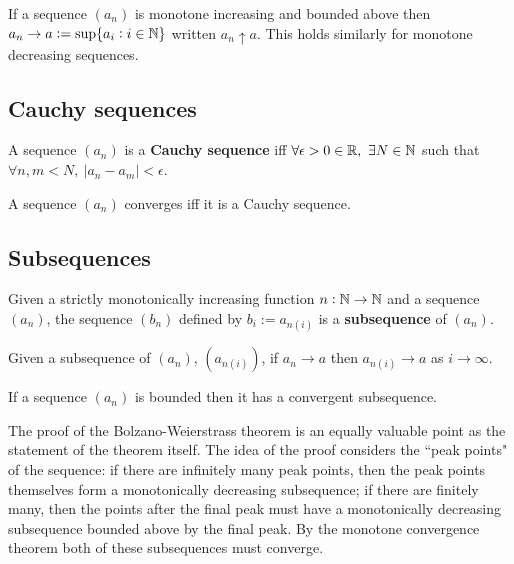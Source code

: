 \documentclass{article}
\begin{document}
\begin{theorem}
    If a sequence $(a_n)$ is monotone increasing and bounded above then $a_n\rightarrow a := \sup\{a_i:i\in\mathbb{N}\}$ written $a_n\uparrow a$. This holds similarly for monotone decreasing sequences.
\end{theorem}

\subsection{Cauchy sequences}

\begin{definition}
   A sequence $(a_n)$ is a \textbf{Cauchy sequence} iff $\forall \epsilon>0\in\mathbb{R}, \ \exists N\in\mathbb{N}$ such that $\forall n,m<N, \ |a_n-a_m|<\epsilon$.
\end{definition}

\begin{theorem}
    A sequence $(a_n)$ converges iff it is a Cauchy sequence.
\end{theorem}

\subsection{Subsequences}

\begin{definition}[Subsequence]
    Given a strictly monotonically increasing function $n:\mathbb{N}\rightarrow\mathbb{N}$ and a sequence $(a_n)$, the  sequence $(b_n)$ defined by $b_i:=a_{n(i)}$ is a \textbf{subsequence} of $(a_n)$.
\end{definition}

\begin{theorem}
    Given a subsequence of $(a_n)$, $(a_{n(i)})$, if $a_n\rightarrow a$ then $a_{n(i)}\rightarrow a$ as $i\rightarrow\infty$.
\end{theorem}

\begin{theorem}
    If a sequence $(a_n)$ is bounded then it has a convergent subsequence.
\end{theorem}

\begin{note}
    The proof of the Bolzano-Weierstrass theorem is an equally valuable point as the statement of the theorem itself. The idea of the proof considers the ``peak points" of the sequence: if there are infinitely many peak points, then the peak points themselves form a monotonically decreasing subsequence; if there are finitely many, then the points after the final peak must have a monotonically decreasing subsequence bounded above by the final peak. By the monotone convergence theorem both of these subsequences must converge.
\end{note}
\end{document}

